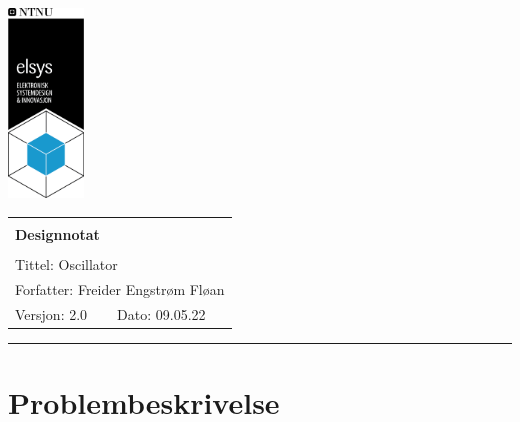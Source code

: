 \documentclass[a4paper,11pt,norsk]{article}
\begin{document}
\begin{minipage}[c]{0.15\textwidth}
\includegraphics[width=2.0cm]{D1/Images/elsys_pos_staaende_ntnu.png}  
\end{minipage}
\begin{minipage}[c]{0.85\textwidth}

\renewcommand{\arraystretch}{1.7}
\large 
\begin{tabularx}{\textwidth}{|X|X|}
\hline
\multicolumn{2}{|l|}{} \\
\multicolumn{2}{|l|}{\huge \textbf{Designnotat}} \\
\multicolumn{2}{|l|}{}  \\
\hline
\multicolumn{2}{|l|}{Tittel: 
Oscillator
} \\
\hline
\multicolumn{2}{|l|}{Forfatter: 
Freider Engstrøm Fløan
} \\
\hline
Versjon: 2.0 & Dato: 09.05.22
\\
\hline 
\end{tabularx}
\end{minipage}
\normalsize


\setlength{\parskip}{0ex}
\renewcommand{\baselinestretch}{0.1}\normalsize
\tableofcontents
\renewcommand{\baselinestretch}{1.00}\normalsize
\setlength{\parskip}{2ex}
\rule{\textwidth}{1pt}
\label{sec:innledning}

\newpage



\section{Problembeskrivelse}
\label{sec:problembeskrivelse}
\end{document}
